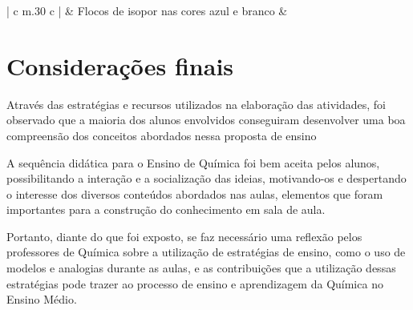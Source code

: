 \begin{refsection}
\begin{longquadro}[t]{ | c m{.30\textwidth} c |}
            & Flocos de isopor nas cores azul e branco%
            & \\

    \end{longquadro}

    \section{Considerações finais}

    Através das estratégias e recursos utilizados na elaboração das atividades, foi observado que a maioria dos alunos envolvidos conseguiram desenvolver uma boa compreensão dos conceitos abordados nessa proposta de ensino  

    A sequência didática para o Ensino de Química foi bem aceita pelos alunos, possibilitando a interação e a socialização das ideias, motivando-os e despertando o interesse dos diversos conteúdos abordados nas aulas, elementos que foram importantes para a construção do conhecimento em sala de aula.  

    Portanto, diante do que foi exposto, se faz necessário uma reflexão pelos professores de Química sobre a utilização de estratégias de ensino, como o uso de modelos e analogias durante as aulas, e as contribuições que a utilização dessas estratégias pode trazer ao processo de ensino e aprendizagem da Química no Ensino Médio.  

    \nocite{NOVAK1991Ayudar}
    \nocite{NUNESAndFERRAZDAndJUSTINA2007Estudos}

    \printbibliography[heading=subbibliography,notcategory=fullcited]

    \label{chap:utilizacao-modelosend}

\end{refsection}
